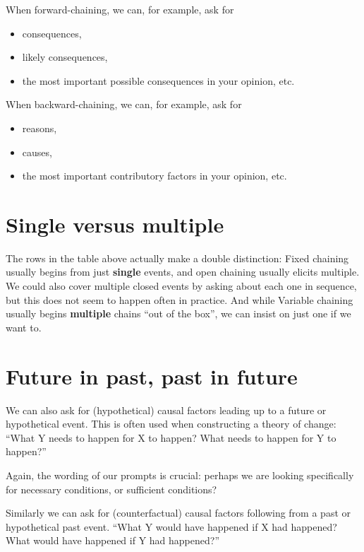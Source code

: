 \documentclass[
]{book}
\providecommand{\tightlist}{%
  \setlength{\itemsep}{0pt}\setlength{\parskip}{0pt}}
\begin{document}
When forward-chaining, we can, for example, ask for

\begin{itemize}
\tightlist
\item
  consequences,
\item
  likely consequences,
\item
  the most important possible consequences in your opinion, etc.
\end{itemize}

When backward-chaining, we can, for example, ask for

\begin{itemize}
\tightlist
\item
  reasons,
\item
  causes,
\item
  the most important contributory factors in your opinion, etc.
\end{itemize}

\hypertarget{single-versus-multiple}{%
\section{Single versus multiple}\label{single-versus-multiple}}

The rows in the table above actually make a double distinction: Fixed chaining usually begins from just \textbf{single} events, and open chaining usually elicits multiple. We could also cover multiple closed events by asking about each one in sequence, but this does not seem to happen often in practice. And while Variable chaining usually begins \textbf{multiple} chains ``out of the box'', we can insist on just one if we want to.

\hypertarget{future-in-past-past-in-future}{%
\section{Future in past, past in future}\label{future-in-past-past-in-future}}

We can also ask for (hypothetical) causal factors leading up to a future or hypothetical event. This is often used when constructing a theory of change: ``What Y needs to happen for X to happen? What needs to happen for Y to happen?''

Again, the wording of our prompts is crucial: perhaps we are looking specifically for necessary conditions, or sufficient conditions?

Similarly we can ask for (counterfactual) causal factors following from a past or hypothetical past event. ``What Y would have happened if X had happened? What would have happened if Y had happened?''
\end{document}
